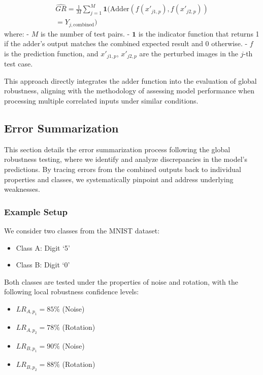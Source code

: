 \documentclass[10pt, conference, a4paper, final]{IEEEtran}
\begin{document}
\begin{itemize}
        \begin{multline}
            \hat{GR} = \frac{1}{M} \sum_{j=1}^M \mathbf{1}(\text{Adder}(f(x'_{j1,p}), f(x'_{j2,p})) \\= Y_{j,\text{combined}})
        \end{multline}
        where:
        - \(M\) is the number of test pairs.
        - \(\mathbf{1}\) is the indicator function that returns 1 if the adder's output matches the combined expected result and 0 otherwise.
        - \(f\) is the prediction function, and \(x'_{j1,p}\), \(x'_{j2,p}\) are the perturbed images in the \(j\)-th test case.
        
        This approach directly integrates the adder function into the evaluation of global robustness, aligning with the methodology of assessing model performance when processing multiple correlated inputs under similar conditions.
        
        
    \end{itemize}

\subsection{Error Summarization}
This section details the error summarization process following the global robustness testing, where we identify and analyze discrepancies in the model's predictions. By tracing errors from the combined outputs back to individual properties and classes, we systematically pinpoint and address underlying weaknesses.

\subsubsection{Example Setup}
We consider two classes from the MNIST dataset:
\begin{itemize}
    \item Class A: Digit `5'
    \item Class B: Digit `0'
\end{itemize}
Both classes are tested under the properties of noise and rotation, with the following local robustness confidence levels:
\begin{itemize}
    \item \( LR_{A,p_1} = 85\% \) (Noise)
    \item \( LR_{A,p_2} = 78\% \) (Rotation)
    \item \( LR_{B,p_1} = 90\% \) (Noise)
    \item \( LR_{B,p_2} = 88\% \) (Rotation)
\end{itemize}
\end{document}
